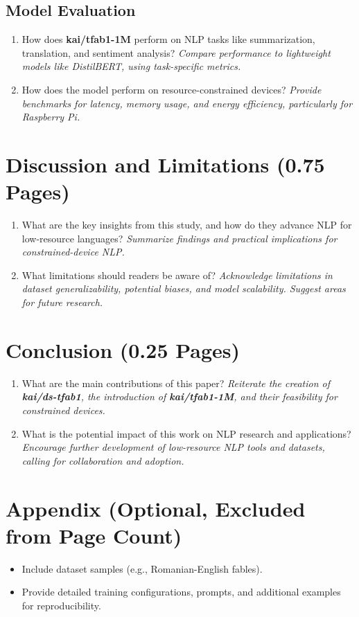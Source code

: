 \documentclass[11pt]{article}
\begin{document}
\subsection{Model Evaluation}
\begin{enumerate}
    \item How does \textbf{kai/tfab1-1M} perform on NLP tasks like summarization, translation, and sentiment analysis?  
    \textit{Compare performance to lightweight models like DistilBERT, using task-specific metrics.}

    \item How does the model perform on resource-constrained devices?  
    \textit{Provide benchmarks for latency, memory usage, and energy efficiency, particularly for Raspberry Pi.}
\end{enumerate}

\section{Discussion and Limitations (0.75 Pages)}
\begin{enumerate}
    \item What are the key insights from this study, and how do they advance NLP for low-resource languages?  
    \textit{Summarize findings and practical implications for constrained-device NLP.}

    \item What limitations should readers be aware of?  
    \textit{Acknowledge limitations in dataset generalizability, potential biases, and model scalability. Suggest areas for future research.}
\end{enumerate}

\section{Conclusion (0.25 Pages)}
\begin{enumerate}
    \item What are the main contributions of this paper?  
    \textit{Reiterate the creation of \textbf{kai/ds-tfab1}, the introduction of \textbf{kai/tfab1-1M}, and their feasibility for constrained devices.}

    \item What is the potential impact of this work on NLP research and applications?  
    \textit{Encourage further development of low-resource NLP tools and datasets, calling for collaboration and adoption.}
\end{enumerate}



\appendix
\section{Appendix (Optional, Excluded from Page Count)}
\begin{itemize}
    \item Include dataset samples (e.g., Romanian-English fables).
    \item Provide detailed training configurations, prompts, and additional examples for reproducibility.
\end{itemize}
\end{document}
